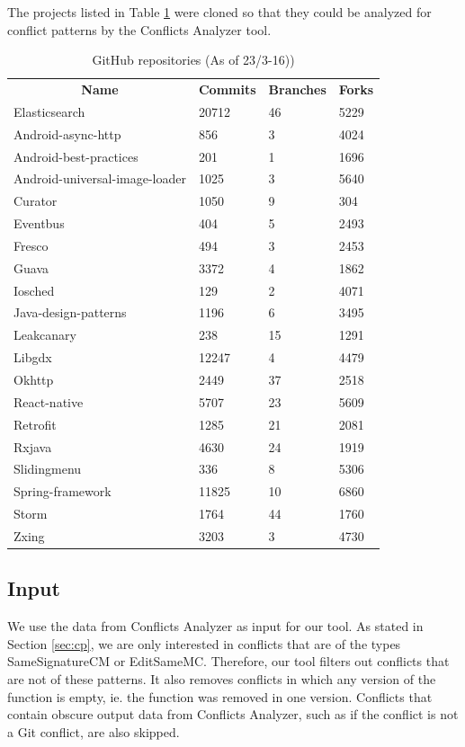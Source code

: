 The projects listed in Table \ref{table:repositories} were cloned so that they could be analyzed for conflict patterns by the Conflicts Analyzer tool.
\FloatBarrier
\begin{table}
\caption{GitHub repositories (As of 23/3-16))}\label{table:repositories}
\begin{tabular}{ l l l l}
\hline
\multicolumn{1}{c}{\textbf{Name}} & \multicolumn{1}{c}{\textbf{Commits}} & \multicolumn{1}{c}{\textbf{Branches}} & \multicolumn{1}{c}{\textbf{Forks}}\\
Elasticsearch & 20712 & 46 & 5229\\
Android-async-http & 856 & 3 & 4024\\
Android-best-practices & 201 & 1 & 1696\\
Android-universal-image-loader & 1025 & 3 & 5640\\
Curator & 1050 & 9 & 304\\
Eventbus & 404 & 5 & 2493\\
Fresco & 494 & 3 & 2453\\
Guava & 3372 & 4 & 1862\\
Iosched & 129 & 2 & 4071\\
Java-design-patterns & 1196 & 6 & 3495\\
Leakcanary & 238 & 15 & 1291\\
Libgdx & 12247 & 4 & 4479\\
Okhttp & 2449 & 37 & 2518\\
React-native & 5707 & 23 & 5609\\
Retrofit & 1285 & 21 & 2081\\
Rxjava & 4630 & 24 & 1919\\
Slidingmenu & 336 & 8 & 5306\\
Spring-framework & 11825 & 10 & 6860\\
Storm & 1764 & 44 & 1760\\
Zxing & 3203 & 3 & 4730
\end{tabular}
\end{table}
\FloatBarrier

\subsection{Input}
We use the data from Conflicts Analyzer as input for our tool. As stated in Section \ref{sec:cp}, we are only interested in conflicts that are of the types SameSignatureCM or EditSameMC. Therefore, our tool filters out conflicts that are not of these patterns. It also removes conflicts in which any version of the function is empty, ie. the function was removed in one version. Conflicts that contain obscure output data from Conflicts Analyzer, such as if the conflict is not a Git conflict, are also skipped.


